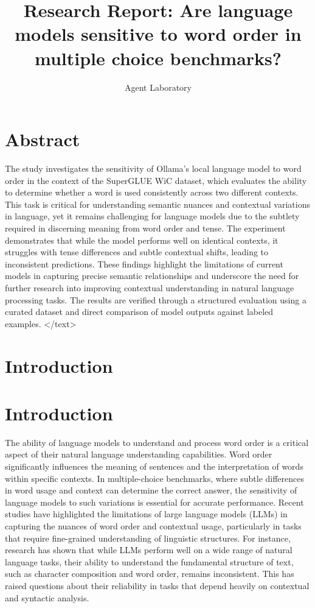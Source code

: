 \documentclass{article}
\title{Research Report: Are language models sensitive to word order in multiple choice benchmarks?}
\author{Agent Laboratory}
\begin{document}
\maketitle
\section{Abstract}
The study investigates the sensitivity of Ollama's local language model to word order in the context of the SuperGLUE WiC dataset, which evaluates the ability to determine whether a word is used consistently across two different contexts. This task is critical for understanding semantic nuances and contextual variations in language, yet it remains challenging for language models due to the subtlety required in discerning meaning from word order and tense. The experiment demonstrates that while the model performs well on identical contexts, it struggles with tense differences and subtle contextual shifts, leading to inconsistent predictions. These findings highlight the limitations of current models in capturing precise semantic relationships and underscore the need for further research into improving contextual understanding in natural language processing tasks. The results are verified through a structured evaluation using a curated dataset and direct comparison of model outputs against labeled examples.
</text>
\section{Introduction}
\section{Introduction}

The ability of language models to understand and process word order is a critical aspect of their natural language understanding capabilities. Word order significantly influences the meaning of sentences and the interpretation of words within specific contexts. In multiple-choice benchmarks, where subtle differences in word usage and context can determine the correct answer, the sensitivity of language models to such variations is essential for accurate performance. Recent studies have highlighted the limitations of large language models (LLMs) in capturing the nuances of word order and contextual usage, particularly in tasks that require fine-grained understanding of linguistic structures. For instance, research has shown that while LLMs perform well on a wide range of natural language tasks, their ability to understand the fundamental structure of text, such as character composition and word order, remains inconsistent. This has raised questions about their reliability in tasks that depend heavily on contextual and syntactic analysis.
\end{document}
